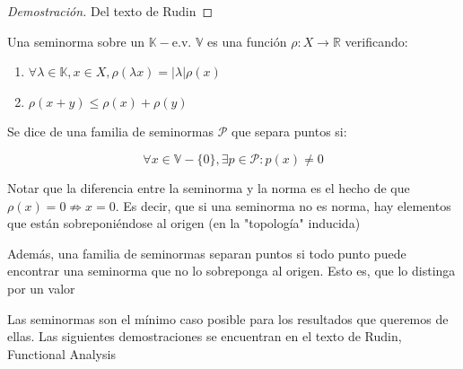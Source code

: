 \begin{proof}[Demostración]
	Del texto de Rudin
\end{proof}

\begin{defn}
	Una seminorma sobre un $\mathbb{K}-$e.v. $\mathbb{V}$ es una función $\rho: X\to \mathbb{R}$ verificando:
	
	\begin{enumerate}
		\item $\forall \lambda \in \mathbb{K}, x \in X, \rho(\lambda x) = |\lambda| \rho(x)$
		\item $\rho(x+y) \leq \rho(x) + \rho(y)$
	\end{enumerate}
	
	Se dice de una familia de seminormas $\mathcal{P} $ que separa puntos si:
	
	\begin{equation*}
		\forall x \in \mathbb{V} - \{0\} ,  \exists p \in \mathcal{P} : p(x) \neq 0
	\end{equation*}
\end{defn} 

\begin{rmrk}
	Notar que la diferencia entre la seminorma y la norma es el hecho de que $\rho(x) =0 \not\Rightarrow  x = 0$. Es decir, que si  una seminorma no es norma, hay elementos que están sobreponiéndose al origen (en la "topología" inducida)
	
	Además, una familia de seminormas separan puntos si todo punto puede encontrar una seminorma que no lo sobreponga al origen. Esto es, que lo distinga por un valor  
\end{rmrk}

\begin{rmrk}
	Las seminormas son el mínimo caso posible para los resultados que queremos de ellas. Las siguientes demostraciones se encuentran en el texto de Rudin, Functional Analysis
\end{rmrk}




